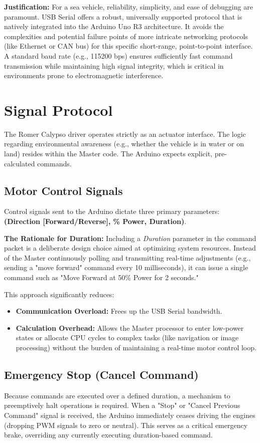 \documentclass[12pt,a4paper]{article}
\begin{document}
\textbf{Justification:} For a sea vehicle, reliability, simplicity, and ease of debugging are paramount. USB Serial offers a robust, universally supported protocol that is natively integrated into the Arduino Uno R3 architecture. It avoids the complexities and potential failure points of more intricate networking protocols (like Ethernet or CAN bus) for this specific short-range, point-to-point interface. A standard baud rate (e.g., 115200 bps) ensures sufficiently fast command transmission while maintaining high signal integrity, which is critical in environments prone to electromagnetic interference.

\section{Signal Protocol}
The Romer Calypso driver operates strictly as an actuator interface. The logic regarding environmental awareness (e.g., whether the vehicle is in water or on land) resides within the Master code. The Arduino expects explicit, pre-calculated commands.

\subsection{Motor Control Signals}
Control signals sent to the Arduino dictate three primary parameters: \textbf{(Direction [Forward/Reverse], \% Power, Duration)}.

\textbf{The Rationale for Duration:} Including a \textit{Duration} parameter in the command packet is a deliberate design choice aimed at optimizing system resources. Instead of the Master continuously polling and transmitting real-time adjustments (e.g., sending a "move forward" command every 10 milliseconds), it can issue a single command such as "Move Forward at 50\% Power for 2 seconds." 

This approach significantly reduces:
\begin{itemize}
    \item \textbf{Communication Overload:} Frees up the USB Serial bandwidth.
    \item \textbf{Calculation Overhead:} Allows the Master processor to enter low-power states or allocate CPU cycles to complex tasks (like navigation or image processing) without the burden of maintaining a real-time motor control loop.
\end{itemize}

\subsection{Emergency Stop (Cancel Command)}
Because commands are executed over a defined duration, a mechanism to preemptively halt operations is required. 
When a "Stop" or "Cancel Previous Command" signal is received, the Arduino immediately ceases driving the engines (dropping PWM signals to zero or neutral). This serves as a critical emergency brake, overriding any currently executing duration-based command.
\end{document}
